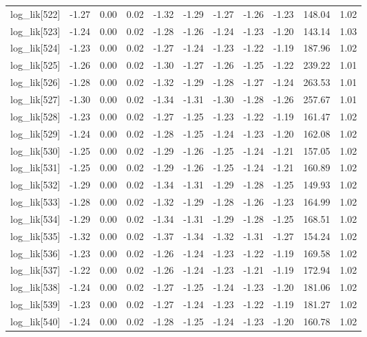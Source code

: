 \begin{table}[ht]
\begin{tabular}{rrrrrrrrrrr}
  log\_lik[522] & -1.27 & 0.00 & 0.02 & -1.32 & -1.29 & -1.27 & -1.26 & -1.23 & 148.04 & 1.02 \\ 
  log\_lik[523] & -1.24 & 0.00 & 0.02 & -1.28 & -1.26 & -1.24 & -1.23 & -1.20 & 143.14 & 1.03 \\ 
  log\_lik[524] & -1.23 & 0.00 & 0.02 & -1.27 & -1.24 & -1.23 & -1.22 & -1.19 & 187.96 & 1.02 \\ 
  log\_lik[525] & -1.26 & 0.00 & 0.02 & -1.30 & -1.27 & -1.26 & -1.25 & -1.22 & 239.22 & 1.01 \\ 
  log\_lik[526] & -1.28 & 0.00 & 0.02 & -1.32 & -1.29 & -1.28 & -1.27 & -1.24 & 263.53 & 1.01 \\ 
  log\_lik[527] & -1.30 & 0.00 & 0.02 & -1.34 & -1.31 & -1.30 & -1.28 & -1.26 & 257.67 & 1.01 \\ 
  log\_lik[528] & -1.23 & 0.00 & 0.02 & -1.27 & -1.25 & -1.23 & -1.22 & -1.19 & 161.47 & 1.02 \\ 
  log\_lik[529] & -1.24 & 0.00 & 0.02 & -1.28 & -1.25 & -1.24 & -1.23 & -1.20 & 162.08 & 1.02 \\ 
  log\_lik[530] & -1.25 & 0.00 & 0.02 & -1.29 & -1.26 & -1.25 & -1.24 & -1.21 & 157.05 & 1.02 \\ 
  log\_lik[531] & -1.25 & 0.00 & 0.02 & -1.29 & -1.26 & -1.25 & -1.24 & -1.21 & 160.89 & 1.02 \\ 
  log\_lik[532] & -1.29 & 0.00 & 0.02 & -1.34 & -1.31 & -1.29 & -1.28 & -1.25 & 149.93 & 1.02 \\ 
  log\_lik[533] & -1.28 & 0.00 & 0.02 & -1.32 & -1.29 & -1.28 & -1.26 & -1.23 & 164.99 & 1.02 \\ 
  log\_lik[534] & -1.29 & 0.00 & 0.02 & -1.34 & -1.31 & -1.29 & -1.28 & -1.25 & 168.51 & 1.02 \\ 
  log\_lik[535] & -1.32 & 0.00 & 0.02 & -1.37 & -1.34 & -1.32 & -1.31 & -1.27 & 154.24 & 1.02 \\ 
  log\_lik[536] & -1.23 & 0.00 & 0.02 & -1.26 & -1.24 & -1.23 & -1.22 & -1.19 & 169.58 & 1.02 \\ 
  log\_lik[537] & -1.22 & 0.00 & 0.02 & -1.26 & -1.24 & -1.23 & -1.21 & -1.19 & 172.94 & 1.02 \\ 
  log\_lik[538] & -1.24 & 0.00 & 0.02 & -1.27 & -1.25 & -1.24 & -1.23 & -1.20 & 181.06 & 1.02 \\ 
  log\_lik[539] & -1.23 & 0.00 & 0.02 & -1.27 & -1.24 & -1.23 & -1.22 & -1.19 & 181.27 & 1.02 \\ 
  log\_lik[540] & -1.24 & 0.00 & 0.02 & -1.28 & -1.25 & -1.24 & -1.23 & -1.20 & 160.78 & 1.02 \\ 

\end{tabular}
\end{table}
